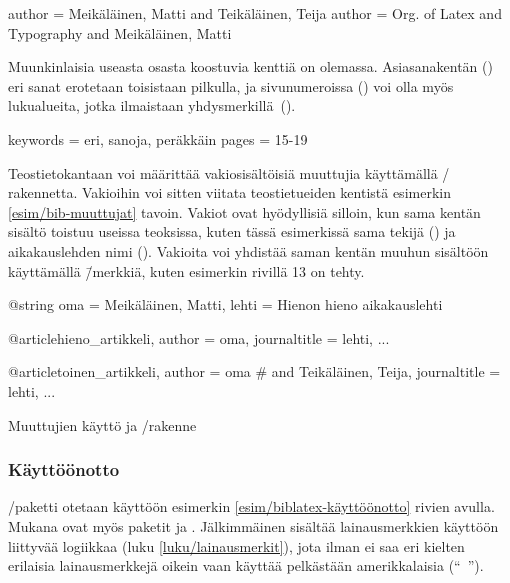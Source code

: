 \begin{koodilohkosis}
author = {Meikäläinen, Matti and Teikäläinen, Teija}
author = {{Org. of Latex and Typography} and Meikäläinen, Matti}
\end{koodilohkosis}

\noindent
Muunkinlaisia useasta osasta koostuvia kenttiä on olemassa.
Asiasanakentän () eri sanat erotetaan toisistaan
pilkulla, ja sivunumeroissa () voi olla myös lukualueita,
jotka ilmaistaan yhdysmerkillä~\mbox{(\koodi{-})}.

\begin{koodilohkosis}
keywords = {eri, sanoja, peräkkäin}
pages = {15-19}
\end{koodilohkosis}

\noindent
Teostietokantaan voi määrittää vakiosisältöisiä muuttujia käyttämällä
\-/ rakennetta. Vakioihin voi sitten viitata
teostietueiden kentistä esimerkin \ref{esim/bib-muuttujat} tavoin.
Vakiot ovat hyödyllisiä silloin, kun sama kentän sisältö toistuu useissa
teoksissa, kuten tässä esimerkissä sama tekijä () ja
aikakauslehden nimi (). Vakioita voi yhdistää
saman kentän muuhun sisältöön käyttämällä \koodi{\#}\=/merkkiä, kuten
esimerkin rivillä 13 on tehty.

\begin{esimerkki*}
\begin{koodilohko}
@string{
  oma = {Meikäläinen, Matti},
  lehti = {Hienon hieno aikakauslehti}
}

@article{hieno_artikkeli,
  author = oma,
  journaltitle = lehti,
  ...
}

@article{toinen_artikkeli,
  author = oma # { and Teikäläinen, Teija},
  journaltitle = lehti,
  ...
}
\end{koodilohko}
  \caption{Muuttujien käyttö ja \-/rakenne}
  \label{esim/bib-muuttujat}
\end{esimerkki*}

\subsubsection{Käyttöönotto}

\-/paketti otetaan käyttöön esimerkin
\ref{esim/biblatex-käyttöönotto} rivien avulla. Mukana ovat myös paketit
 ja . Jälkimmäinen sisältää
lainausmerkkien käyttöön liittyvää logiikkaa (luku
\ref{luku/lainausmerkit}), jota ilman  ei saa eri
kielten erilaisia lainausmerkkejä oikein vaan käyttää pelkästään
amerikkalaisia (``~'').


